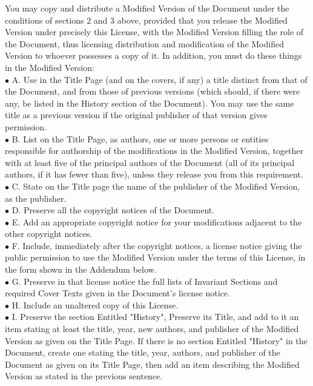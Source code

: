 You may copy and distribute a Modified Version of the Document under the conditions of sections 2 and 3 above, provided that you release the Modified Version under precisely this License, with the Modified Version filling the role of the Document, thus licensing distribution and modification of the Modified Version to whoever possesses a copy of it. In addition, you must do these things in the Modified Version:\\
$\bullet$	A. Use in the Title Page (and on the covers, if any) a title distinct from that of the Document, and from those of previous versions (which should, if there were any, be listed in the History section of the Document). You may use the same title as a previous version if the original publisher of that version gives permission. \\
$\bullet$	B. List on the Title Page, as authors, one or more persons or entities responsible for authorship of the modifications in the Modified Version, together with at least five of the principal authors of the Document (all of its principal authors, if it has fewer than five), unless they release you from this requirement. \\
$\bullet$	C. State on the Title page the name of the publisher of the Modified Version, as the publisher. \\
$\bullet$	D. Preserve all the copyright notices of the Document. \\
$\bullet$	E. Add an appropriate copyright notice for your modifications adjacent to the other copyright notices. \\
$\bullet$	F. Include, immediately after the copyright notices, a license notice giving the public permission to use the Modified Version under the terms of this License, in the form shown in the Addendum below. \\
$\bullet$	G. Preserve in that license notice the full lists of Invariant Sections and required Cover Texts given in the Document's license notice. \\
$\bullet$	H. Include an unaltered copy of this License. \\
$\bullet$	I. Preserve the section Entitled "History", Preserve its Title, and add to it an item stating at least the title, year, new authors, and publisher of the Modified Version as given on the Title Page. If there is no section Entitled "History" in the Document, create one stating the title, year, authors, and publisher of the Document as given on its Title Page, then add an item describing the Modified Version as stated in the previous sentence. \\
